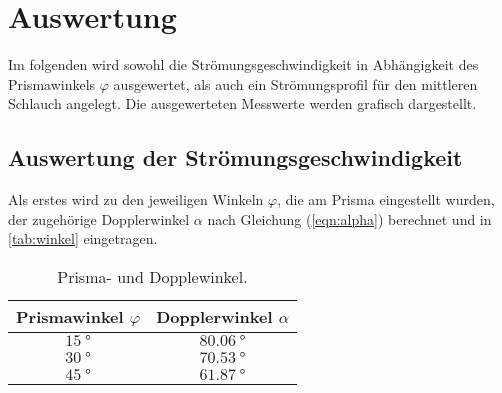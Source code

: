 \section{Auswertung}
\label{sec:Auswertung}

Im folgenden wird sowohl die Strömungsgeschwindigkeit in Abhängigkeit des Prismawinkels $\varphi$ ausgewertet, als auch ein Strömungsprofil für den
mittleren Schlauch angelegt. Die ausgewerteten Messwerte werden grafisch dargestellt.

\subsection{Auswertung der Strömungsgeschwindigkeit}
\label{subsec:stroemi}
Als erstes wird zu den jeweiligen Winkeln $\varphi$, die am Prisma eingestellt wurden, der zugehörige Dopplerwinkel $\alpha$ nach Gleichung (\ref{eqn:alpha})
berechnet und in \autoref{tab:winkel} eingetragen.
\begin{table}[H]
  \centering
  \caption{Prisma- und Dopplewinkel.}
  \label{tab:winkel}
  \begin{tabular}{c c}
    \toprule
    Prismawinkel $\varphi$ & Dopplerwinkel $\alpha$ \\
    \midrule
    $\SI{15}{\degree}$ & $\SI{80,06}{\degree}$ \\
    $\SI{30}{\degree}$ & $\SI{70,53}{\degree}$ \\
    $\SI{45}{\degree}$ & $\SI{61,87}{\degree}$ \\
    \bottomrule
  \end{tabular}
\end{table}

